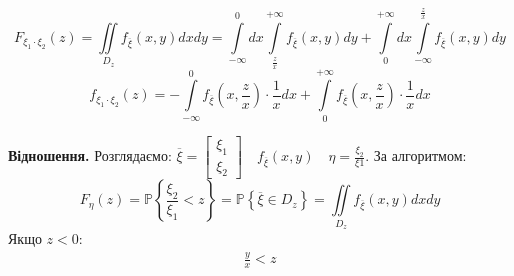 $$
F_{\xi_1 \cdot \xi_2} (z) =  \iint\limits_{D_z}^{ }{ f_{\overline{\xi}} (x,y) dxdy} =  \int\limits_{-\infty}^{0}{dx  \int\limits_{ \frac{z}{x}  }^{ +\infty}{ f_{\overline{\xi}} (x,y )dy}} +  \int\limits_{0}^{ +\infty}{ dx  \int\limits_{-\infty}^{ \frac{z}{x} }{f_{\overline{\xi}} (x,y )dy}}
$$
$$
f_{\xi_1 \cdot \xi_2} (z) = -  \int\limits_{-\infty}^{ 0}{ f_{\overline{\xi}}(x, \frac{z}{x})\cdot \frac{1}{x} dx  } + \int\limits_{0}^{ + \infty}{ f_{\overline{\xi}}(x, \frac{z}{x})\cdot \frac{1}{x} dx  }
$$

\textbf{Відношення.} Розглядаємо: $\overline{\xi} = \begin{bmatrix}
 \xi_1 \\
 \xi_2
\end{bmatrix} \quad f_{\overline{\xi}} (x,y) \quad \eta = \frac{\xi_2}{\xi1} $. За алгоритмом:
$$
F_{\eta} (z) = \mathbb{P} \left\lbrace \frac{\xi_2}{\xi_1} <z  \right\rbrace = \mathbb{P} \left\lbrace \overline{\xi} \in D_z \right\rbrace =  \iint\limits_{D_z}^{}{ f_{\overline{\xi}}(x,y)dxdy}
$$
Якщо $z < 0 :$
$$
\begin{gathered}
 \frac{y}{x} < z
\end{gathered}
$$
